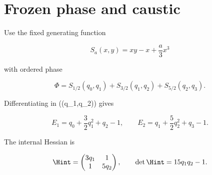 \section{Frozen phase and caustic}

Use the fixed generating function

\[
S_a(x,y)=xy-x+\frac a3x^3
\]

with ordered phase

\[
\Phi=S_{1/2}(q_0,q_1)+S_{3/2}(q_1,q_2)+S_{5/2}(q_2,q_3).
\]

Differentiating in ((q_1,q_2)) gives

\[
E_1=q_0+\frac32q_1^2+q_2-1,
\qquad
E_2=q_1+\frac52q_2^2+q_3-1.
\]

The internal Hessian is

\[
\Hint=\begin{pmatrix}3q_1&1\\1&5q_2\end{pmatrix},
\qquad
\det\Hint=15q_1q_2-1.
\]
